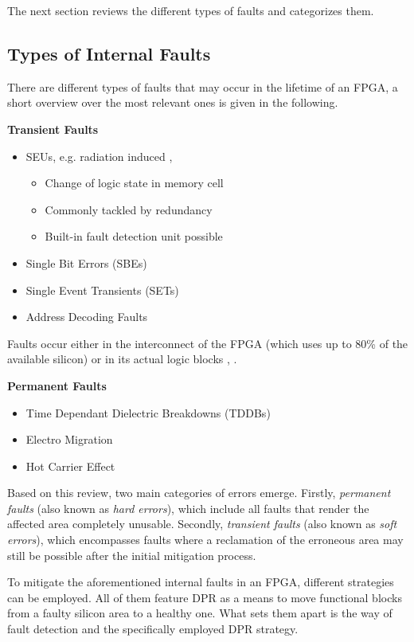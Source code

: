 The next section reviews the different types of faults and categorizes them. 

\subsection{Types of Internal Faults}
There are different types of faults that may occur in the lifetime of an \gls{FPGA}, a short overview over the most relevant ones is given in the following.
\par
\textbf{Transient Faults}
\begin{itemize}
    \item \glspl{SEU}, e.g. radiation induced \cite{alkady_fault-tolerant_2014}, \cite{lee_fault-tolerant_2017}
    \begin{itemize}
    \item Change of logic state in memory cell
    \item Commonly tackled by redundancy
    \item Built-in fault detection unit possible
    \end{itemize}
    \item Single Bit Errors (SBEs)
    \item Single Event Transients (SETs)
    \item Address Decoding Faults
\end{itemize}

Faults occur either in the interconnect of the \gls{FPGA} (which uses up to 80\% of the available silicon) or in its actual logic blocks \cite{alkady_fault-tolerant_2014}, \cite{jing_huang_routability_2004}.
\par
\textbf{Permanent Faults}
\begin{itemize}
    \item Time Dependant Dielectric Breakdowns (TDDBs)
    \item Electro Migration
    \item Hot Carrier Effect
\end{itemize}

Based on this review, two main categories of errors emerge.
Firstly, \textit{permanent faults} (also known as \textit{hard errors}), which include all faults that render the affected area completely unusable. 
Secondly, \textit{transient faults} (also known as \textit{soft errors}), which encompasses faults where a reclamation of the erroneous area may still be possible after the initial mitigation process.

To mitigate the aforementioned internal faults in an \gls{FPGA}, different strategies can be employed.
All of them feature \gls{DPR} as a means to move functional blocks from a faulty silicon area to a healthy one.
What sets them apart is the way of fault detection and the specifically employed \gls{DPR} strategy.


